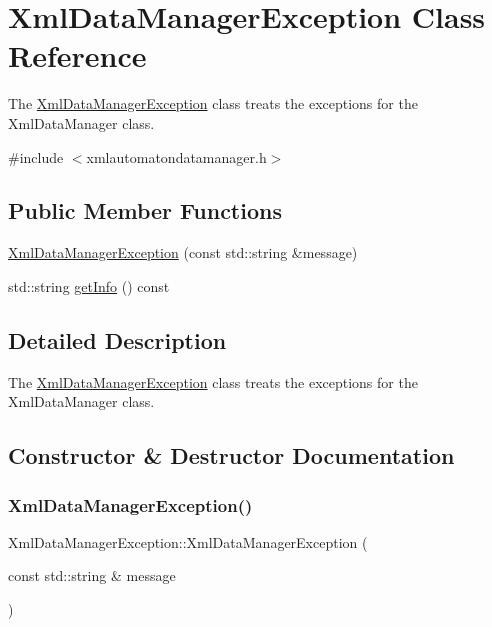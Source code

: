 \hypertarget{class_xml_data_manager_exception}{}\section{Xml\+Data\+Manager\+Exception Class Reference}
\label{class_xml_data_manager_exception}


The \mbox{\hyperlink{class_xml_data_manager_exception}{Xml\+Data\+Manager\+Exception}} class treats the exceptions for the Xml\+Data\+Manager class.  




{\ttfamily \#include $<$xmlautomatondatamanager.\+h$>$}

\subsection*{Public Member Functions}
\begin{DoxyCompactItemize}
\item 
\mbox{\hyperlink{class_xml_data_manager_exception_a94a5bf20e818c607cf1c5dcbb7e25dd0}{Xml\+Data\+Manager\+Exception}} (const std\+::string \&message)
\item 
std\+::string \mbox{\hyperlink{class_xml_data_manager_exception_a5b801cba8e8273b070453e51f44f012e}{get\+Info}} () const
\end{DoxyCompactItemize}


\subsection{Detailed Description}
The \mbox{\hyperlink{class_xml_data_manager_exception}{Xml\+Data\+Manager\+Exception}} class treats the exceptions for the Xml\+Data\+Manager class. 

\subsection{Constructor \& Destructor Documentation}
\mbox{\label{class_xml_data_manager_exception_a94a5bf20e818c607cf1c5dcbb7e25dd0}} 
\subsubsection{\texorpdfstring{Xml\+Data\+Manager\+Exception()}{XmlDataManagerException()}}
{\footnotesize\ttfamily Xml\+Data\+Manager\+Exception\+::\+Xml\+Data\+Manager\+Exception (\begin{DoxyParamCaption}\item[{const std\+::string \&}]{message }\end{DoxyParamCaption})\hspace{0.3cm}{\ttfamily [inline]}}

